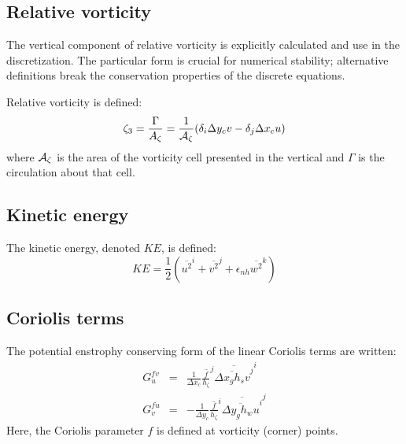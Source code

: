 \subsection{Relative vorticity}

The vertical component of relative vorticity is explicitly calculated
and use in the discretization. The particular form is crucial for
numerical stability; alternative definitions break the conservation
properties of the discrete equations.

Relative vorticity is defined:
\begin{equation}
\zeta_3 = \frac{\Gamma}{A_\zeta}
= \frac{1}{{\cal A}_\zeta} ( \delta_i \Delta y_c v - \delta_j \Delta x_c u )
\end{equation}
where ${\cal A}_\zeta$ is the area of the vorticity cell presented in
the vertical and $\Gamma$ is the circulation about that cell.



\subsection{Kinetic energy}

The kinetic energy, denoted $KE$, is defined:
\begin{equation}
KE = \frac{1}{2} ( \overline{ u^2 }^i + \overline{ v^2 }^j 
+ \epsilon_{nh} \overline{ w^2 }^k )
\end{equation}



\subsection{Coriolis terms}

The potential enstrophy conserving form of the linear Coriolis terms
are written:
\begin{eqnarray}
G_u^{fv} & = &
\frac{1}{\Delta x_c}
\overline{ \frac{f}{h_\zeta} }^j \overline{ \overline{ \Delta x_g h_s v }^j }^i \\
G_v^{fu} & = & -
\frac{1}{\Delta y_c}
\overline{ \frac{f}{h_\zeta} }^i \overline{ \overline{ \Delta y_g h_w u }^i }^j
\end{eqnarray}
Here, the Coriolis parameter $f$ is defined at vorticity (corner)
points.

